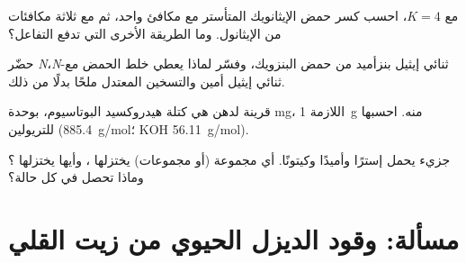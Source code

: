 \begin{exercise}[$\star\star$]\label{exo:b2:acyl-substitution:9}
مع $K = 4$، احسب كسر حمض الإيثانويك المتأستر مع مكافئ واحد، ثم مع ثلاثة
مكافئات من الإيثانول. وما الطريقة الأخرى التي تدفع التفاعل؟
\end{exercise}

\begin{exercise}[$\star\star\star$]\label{exo:b2:acyl-substitution:10}
حضّر \textit{N}،\textit{N}-ثنائي إيثيل بنزأميد من حمض البنزويك، وفسّر لماذا يعطي خلط الحمض
مع ثنائي إيثيل أمين والتسخين المعتدل ملحًا بدلًا من ذلك.
\end{exercise}

\begin{exercise}[$\star\star\star$]\label{exo:b2:acyl-substitution:11}
قرينة  لدهن هي كتلة هيدروكسيد البوتاسيوم، بوحدة mg، اللازمة 
\qty{1}{g} منه. احسبها للتريولين (\qty{885.4}{g/mol}؛ KOH \qty{56.11}{g/mol}).
\end{exercise}

\begin{exercise}[$\star\star\star$]\label{exo:b2:acyl-substitution:12}
جزيء يحمل إسترًا وأميدًا وكيتونًا. أي مجموعة (أو مجموعات) يختزلها ، وأيها يختزلها
؟ وماذا تحصل في كل حالة؟
\end{exercise}

\section{مسألة: وقود الديزل الحيوي من زيت القلي}

